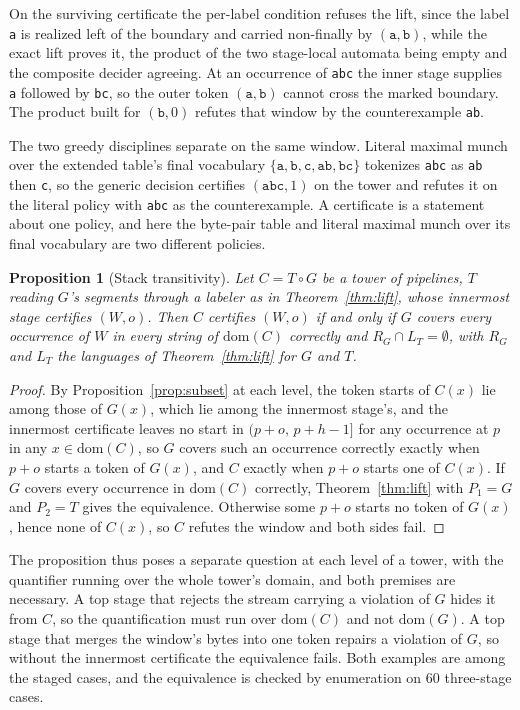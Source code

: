 \documentclass[11pt,a4paper]{article}
\theoremstyle{definition}
\theoremstyle{plain}
\newtheorem{proposition}{Proposition}
\newcommand{\code}[1]{\texttt{#1}}
\begin{document}
On the surviving certificate the per-label condition refuses the lift, since the label \code{a} is realized left of the
boundary and carried non-finally by $(\code{a}, \code{b})$, while the exact lift proves it, the product of the two
stage-local automata being empty and the composite decider agreeing. At an occurrence of \code{abc} the inner stage
supplies \code{a} followed by \code{bc}, so the outer token $(\code{a}, \code{b})$ cannot cross the marked boundary. The
product built for $(\code{b}, 0)$ refutes that window by the counterexample \code{ab}.

The two greedy disciplines separate on the same window. Literal maximal munch over the extended table's final vocabulary
$\{\code{a}, \code{b}, \code{c}, \code{ab}, \code{bc}\}$ tokenizes \code{abc} as \code{ab} then \code{c}, so the generic
decision certifies $(\code{abc}, 1)$ on the tower and refutes it on the literal policy with \code{abc} as the
counterexample. A certificate is a statement about one policy, and here the byte-pair table and literal maximal munch
over its final vocabulary are two different policies.

\begin{proposition}[Stack transitivity]\label{prop:stack}
Let $C = T \circ G$ be a tower of pipelines, $T$ reading $G$'s segments through a labeler as in Theorem~\ref{thm:lift},
whose innermost stage certifies $(W,o)$. Then $C$ certifies $(W,o)$ if and only if $G$ covers every occurrence of $W$ in
every string of $\mathrm{dom}(C)$ correctly and $R_G \cap L_T = \emptyset$, with $R_G$ and $L_T$ the languages of
Theorem~\ref{thm:lift} for $G$ and $T$.
\end{proposition}

\begin{proof}
By Proposition~\ref{prop:subset} at each level, the token starts of $C(x)$ lie among those of $G(x)$, which lie among
the innermost stage's, and the innermost certificate leaves no start in $(p+o,\,p+h-1]$ for any occurrence at $p$ in any
$x \in \mathrm{dom}(C)$, so $G$ covers such an occurrence correctly exactly when $p+o$ starts a token of $G(x)$, and $C$
exactly when $p+o$ starts one of $C(x)$. If $G$ covers every occurrence in $\mathrm{dom}(C)$ correctly,
Theorem~\ref{thm:lift} with $P_1 = G$ and $P_2 = T$ gives the equivalence. Otherwise some $p+o$ starts no token of
$G(x)$, hence none of $C(x)$, so $C$ refutes the window and both sides fail.
\end{proof}

The proposition thus poses a separate question at each level of a tower, with the quantifier running over the whole
tower's domain, and both premises are necessary. A top stage that rejects the stream carrying a violation of $G$ hides
it from $C$, so the quantification must run over $\mathrm{dom}(C)$ and not $\mathrm{dom}(G)$. A top stage that merges
the window's bytes into one token repairs a violation of $G$, so without the innermost certificate the equivalence
fails. Both examples are among the staged cases, and the equivalence is checked by enumeration on 60 three-stage cases.
\end{document}
